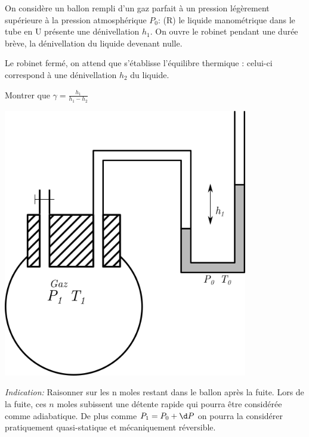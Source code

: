 \begin{Exercise}[title=(*) Expérience de Clément-Desorme détermination de $\gamma$]
	\begin{minipage}{0.45\linewidth}
On considère un ballon rempli d’un gaz parfait à un pression légèrement supérieure à la pression atmosphérique $P_0$:
(R)	le liquide manométrique dans le tube en U présente une dénivellation $h_1$. On ouvre le robinet pendant une durée brève, la dénivellation du liquide devenant nulle.

Le robinet fermé, on attend que s’établisse l’équilibre thermique : celui-ci correspond à une dénivellation $h_2$ du liquide.

Montrer que $\gamma = \frac{h_1}{h_1-h_2}$
	\end{minipage}\hspace*{0.05\linewidth}
	\begin{minipage}{0.45\linewidth}
		\includegraphics[width=0.8\textwidth]{../fig/calculgamma.png}
	\end{minipage}
	\emph{Indication:} Raisonner sur les n moles restant dans le ballon après la fuite. Lors de la fuite, ces $n$ moles subissent une détente rapide qui pourra être considérée comme adiabatique. De plus comme	$P_1 =  P_0 + \d P$ on pourra la considérer pratiquement quasi-statique et mécaniquement réversible.
\end{Exercise}
